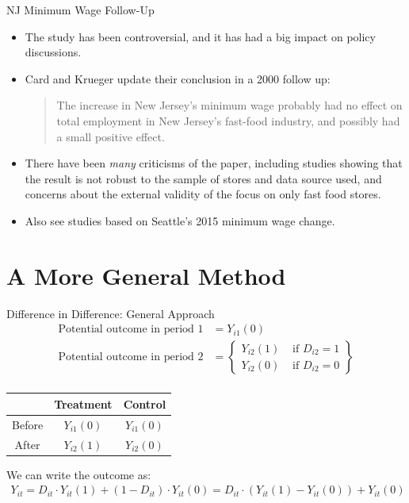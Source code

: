 \documentclass[aspectratio=169,11pt]{beamer}
\begin{document}
\begin{frame}{NJ Minimum Wage Follow-Up}
\begin{itemize}
  \item The study has been controversial, and it has had a
  big impact on policy discussions.

  \medskip
  \item Card and Krueger update their conclusion
  in a 2000 follow up:
  \begin{quotation}
The increase in New Jersey's minimum wage probably
had no effect on total employment in New Jersey's
fast-food industry, and possibly had a small positive
effect.
  \end{quotation}

  \smallskip
  \item There have been \emph{many} criticisms of the paper,
  including studies showing that the result is not robust to the
  sample of stores and data source used, and concerns about
  the external validity of the focus on only fast food stores.

  \smallskip
  \item Also see studies based on Seattle's 2015 minimum wage change. 
\end{itemize}
\end{frame}



\section{A More General Method}



\begin{frame}{Difference in Difference: General Approach}
\begin{align*}
\text{Potential outcome in period } 1&=Y_{i 1}(0)\\
\text{Potential outcome in period } 2&=\left\{ \begin{array}{ll}
Y_{i 2}(1) & \text { if } D_{i 2}=1 \\ 
Y_{i 2}(0) & \text { if } D_{i 2}=0
\end{array}\right\}\\
\end{align*}
\begin{center}
\begin{tabular}{|c|c|c|}
\hline & Treatment & Control \\
\hline Before & $Y_{i 1}(0)$ & $Y_{i 1}(0)$ \\
After & $Y_{i 2}(1)$ & $Y_{i 2}(0)$ \\
\hline
\end{tabular}
\end{center}
We can write the outcome as:
\begin{align*}
Y_{i t}=D_{i t} \cdot Y_{i t}(1)+\left(1-D_{i t}\right) \cdot Y_{i t}(0)=D_{i t} \cdot\left(Y_{i t}(1)-Y_{i t}(0) \right)+Y_{i t}(0)
\end{align*}
\end{frame}
\end{document}
